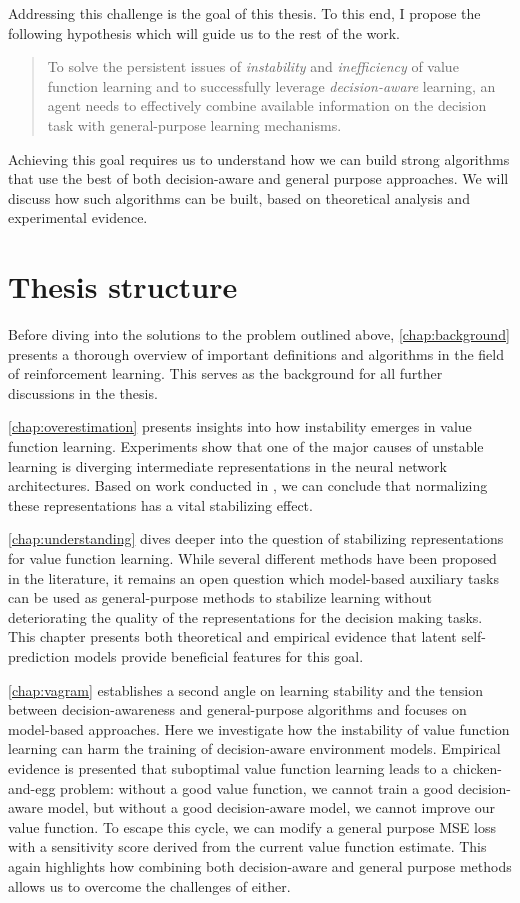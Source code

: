 Addressing this challenge is the goal of this thesis.
To this end, I propose the following hypothesis which will guide us to the rest of the work.

\begin{quote}
	To solve the persistent issues of \emph{instability} and \emph{inefficiency} of value function learning and to successfully leverage \emph{decision-aware} learning, an agent needs to effectively combine available information on the decision task with general-purpose learning mechanisms.
\end{quote}

Achieving this goal requires us to understand how we can build strong algorithms that use the best of both decision-aware and general purpose approaches.
We will discuss how such algorithms can be built, based on theoretical analysis and experimental evidence.

\section{Thesis structure}

Before diving into the solutions to the problem outlined above, \autoref{chap:background} presents a thorough overview of important definitions and algorithms in the field of reinforcement learning.
This serves as the background for all further discussions in the thesis.

\autoref{chap:overestimation} presents insights into how instability emerges in value function learning.
Experiments show that one of the major causes of unstable learning is diverging intermediate representations in the neural network architectures.
Based on work conducted in \textcite{hussing2024dissecting}, we can conclude that normalizing these representations has a vital stabilizing effect.

\autoref{chap:understanding} dives deeper into the question of stabilizing representations for value function learning.
While several different methods have been proposed in the literature, it remains an open question which model-based auxiliary tasks can be used as general-purpose methods to stabilize learning without deteriorating the quality of the representations for the decision making tasks.
This chapter presents both theoretical and empirical evidence that latent self-prediction models provide beneficial features for this goal.

\autoref{chap:vagram} establishes a second angle on learning stability and the tension between decision-awareness and general-purpose algorithms and focuses on model-based approaches.
Here we investigate how the instability of value function learning can harm the training of decision-aware environment models.
Empirical evidence is presented that suboptimal value function learning leads to a chicken-and-egg problem: without a good value function, we cannot train a good decision-aware model, but without a good decision-aware model, we cannot improve our value function.
To escape this cycle, we can modify a general purpose MSE loss with a sensitivity score derived from the current value function estimate.
This again highlights how combining both decision-aware and general purpose methods allows us to overcome the challenges of either.

